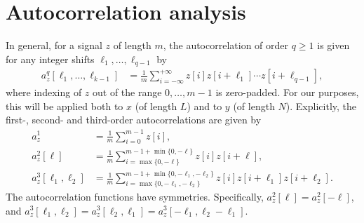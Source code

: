 \documentclass[9pt,twocolumn,twoside,lineno]{pnas-new}
\begin{document}
\section{Autocorrelation analysis} \label{sec:AC_analysis}


In general, for a signal $z$ of length $m$, the autocorrelation of order $q \geq 1$ is given for any integer shifts $\ell_1, \ldots, \ell_{q-1}$ by
\begin{align}
a_z^q[\ell_1,\ldots,\ell_{k-1}]  & = \frac{1}{m} \sum_{i=-\infty}^{+\infty} z[i]z[i+\ell_1]\cdots z[i+\ell_{q-1}],
\label{eq:ac_general}
\end{align}
where indexing of $z$ out of the range $0, \ldots, m-1$ is zero-padded.
For our purposes, this will be applied both to $x$ (of length $L$) and to $y$ (of length $N$).
Explicitly, the first-, second- and third-order autocorrelations are given by 
\begin{align} 
a_z^1 & = \frac{1}{m} \sum_{i=0}^{m-1} z[i], \nonumber\\
a_z^2[\ell] & = \frac{1}{m} \sum_{i = \max\{0, -\ell\}}^{m-1 + \min\{0, -\ell\}} z[i]z[i+\ell], \nonumber\\
a_z^3[\ell_1,\ell_2] & = \frac{1}{m} \sum_{i = \max\{0, -\ell_1, -\ell_2\}}^{m-1 + \min\{0, -\ell_1, -\ell_2\}} z[i]z[i+\ell_1]z[i+\ell_2]. \label{eq:ac_special}
\end{align}
The autocorrelation functions have symmetries. Specifically, $a_z^2[\ell] = a_z^2[-\ell]$, and
$a_z^3[\ell_1,\ell_2] = a_z^3[\ell_2,\ell_1]=a_z^3[-\ell_1,\ell_2-\ell_1].
$
%
\end{document}
